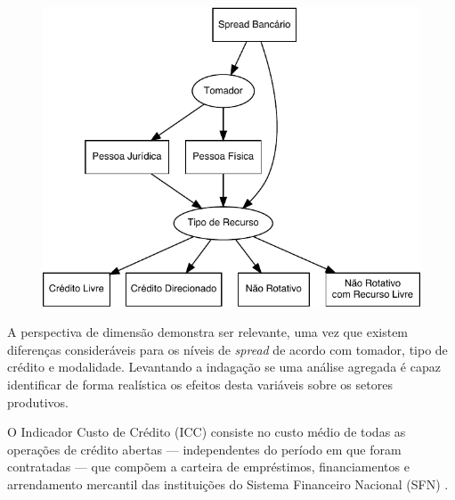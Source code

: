\documentclass[12pt,12pt,openright,oneside,a4paper,chapter=TITLE,section=TITLE,subsection=TITLE,subsubsection=TITLE,english,french,spanish,portugues,sumario=tradicional]{abntex2}
\begin{document}
\begin{figure}

\begin{center}\includegraphics{12-exportedfigures/diagram.spread.dim-1} \end{center}
\label{fig:diagramc}
\end{figure}

A perspectiva de dimensão demonstra ser relevante, uma vez que existem diferenças consideráveis para os níveis de \emph{spread} de acordo com tomador, tipo de crédito e modalidade. Levantando a indagação se uma análise agregada é capaz identificar de forma realística os efeitos desta variáveis sobre os setores produtivos.

O Indicador Custo de Crédito (ICC) consiste no custo médio de todas as
operações de crédito abertas --- independentes do período em que foram
contratadas --- que compõem a carteira de empréstimos, financiamentos e
arrendamento mercantil das instituições do Sistema Financeiro Nacional (SFN) \cite{BCB:2000}.
\end{document}
